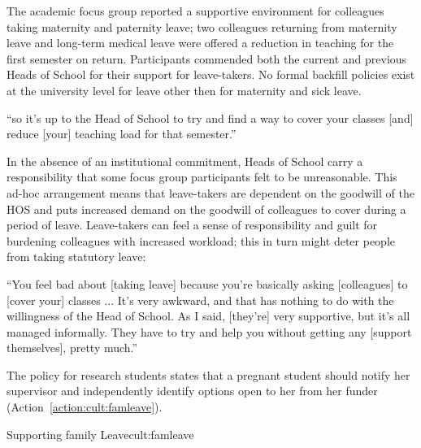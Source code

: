 


The academic focus group reported  a supportive environment for colleagues taking maternity and paternity leave; two colleagues returning from maternity leave and long-term medical leave were offered a reduction in teaching for the first semester on return.  
Participants commended both the current and previous Heads of School for their support for leave-takers. 
No formal backfill policies exist at the university level for leave other then for maternity and sick leave.

\begin{myquote}
    ``so it's up to the Head of School to try and find a way to cover your classes [and] reduce [your] teaching load for that semester.''
\end{myquote}

In the absence of an institutional commitment, Heads of School carry a responsibility that some focus group participants felt to be unreasonable.  This ad-hoc arrangement means that  leave-takers are dependent on the goodwill of the \ac{HOS} and puts increased demand on the goodwill of colleagues to cover during a period of leave.  
Leave-takers can feel a sense of responsibility and guilt for burdening colleagues with increased workload; this in turn might deter people from taking statutory leave:    

\begin{myquote}
“You feel bad about [taking leave] because you're basically asking [colleagues] to [cover your] classes ... It's very awkward, and that has nothing to do with the willingness of the Head of School. As I said, [they’re] very supportive, but it's all managed informally. They have to try and help you without getting any [support themselves], pretty much.”  
\end{myquote}

The policy for research students states that a pregnant student should notify her supervisor and independently identify options open to her from her funder
(Action~\ref{action:cult:famleave}).


\begin{actionblock}{\ksspace{}Supporting family Leave}{cult:famleave}
\actremoveimpediments
\hfill{
    \hypersetup{hidelinks}
    \hyperlink{e5}{\gotoactionsymbol{}}
}
\end{actionblock}




